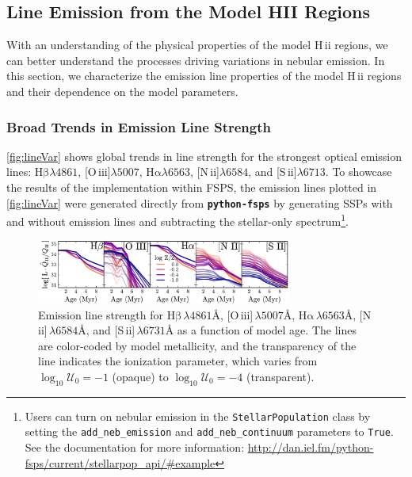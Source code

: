 \documentclass[linenumbers, tighten, trackchanges]{aastex61}%
\newcommand{\Fig}[1]{\autoref{fig:#1}}
\newcommand{\FSPS}{{\sc FSPS}\xspace}
\newcommand{\pFSPS}{{\tt \textbf{python-fsps}}\xspace}
\newcommand{\logten}{\ensuremath{\log_{10}}}
\newcommand{\nii}{[N\,{\sc ii}]\xspace}
\newcommand{\sii}{[S\,{\sc ii}]\xspace}
\newcommand{\oiii}{[O\,{\sc iii}]\xspace}
\newcommand{\ha}{\ensuremath{\mathrm{H\alpha}}}
\newcommand{\hb}{\ensuremath{\mathrm{H\beta}}}
\newcommand{\hii}{H\,{\sc ii}\xspace}
\newcommand\lam[1]{\ensuremath{\lambda #1}}
\newcommand{\ang}{\ensuremath{\mbox{\AA}}}
\newcommand{\logU}{\ensuremath{\logten \mathcal{U}_0}}
\begin{document}

\subsection{Line Emission from the Model HII Regions}\label{sec:models:lines}

With an understanding of the physical properties of the model \hii regions, we can better understand the processes driving variations in nebular emission. In this section, we characterize the emission line properties of the model \hii regions and their dependence on the model parameters. 

\subsubsection{Broad Trends in Emission Line Strength}\label{sec:models:lines:strength}

\Fig{lineVar} shows global trends in line strength for the strongest optical emission lines: \hb{}\lam{4861}, \oiii{}\lam{5007}, \ha{}\lam{6563}, \nii{}\lam{6584}, and \sii{}\lam{6713}. To showcase the results of the implementation within \FSPS, the emission lines plotted in \Fig{lineVar} were generated directly from \pFSPS by generating SSPs with and without emission lines and subtracting the stellar-only spectrum\footnote{Users can turn on nebular emission in the {\tt StellarPopulation} class by setting the {\tt add\_neb\_emission} and {\tt add\_neb\_continuum} parameters to {\tt True}. See the documentation for more information: \url{http://dan.iel.fm/python-fsps/current/stellarpop_api/\#example} }.

\begin{figure}[!htbp]
  \begin{centering}
    \includegraphics[width=0.75\textwidth]{f14.pdf}
    \caption{Emission line strength for \hb{}$\,\lambda4861\ang$, \oiii{}$\,\lambda5007\ang$, \ha{}$\,\lambda6563\ang$, \nii{}$\,\lambda6584\ang$, and \sii{}$\,\lambda6731\ang$ as a function of model age. The lines are color-coded by model metallicity, and the transparency of the line indicates the ionization parameter, which varies from $\logU{}=-1$ (opaque) to $\logU{}=-4$ (transparent).}
    \label{fig:lineVar}
  \end{centering}
\end{figure}
\end{document}
